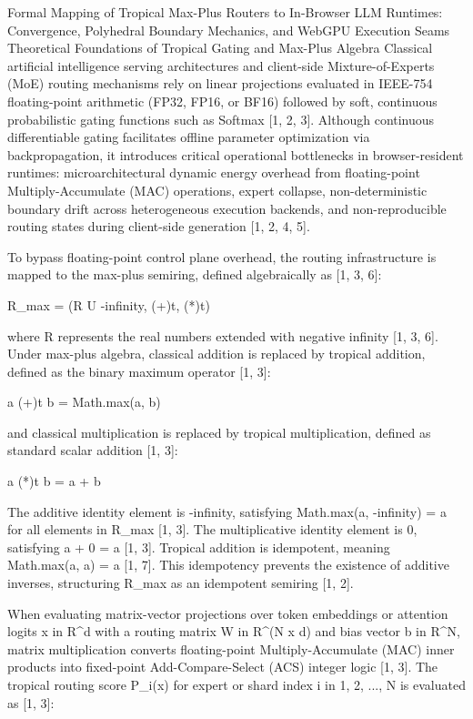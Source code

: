 ﻿Formal Mapping of Tropical Max-Plus Routers to In-Browser LLM Runtimes: Convergence, Polyhedral Boundary Mechanics, and WebGPU Execution Seams
Theoretical Foundations of Tropical Gating and Max-Plus Algebra
Classical artificial intelligence serving architectures and client-side Mixture-of-Experts (MoE) routing mechanisms rely on linear projections evaluated in IEEE-754 floating-point arithmetic (FP32, FP16, or BF16) followed by soft, continuous probabilistic gating functions such as Softmax [1, 2, 3]. Although continuous differentiable gating facilitates offline parameter optimization via backpropagation, it introduces critical operational bottlenecks in browser-resident runtimes: microarchitectural dynamic energy overhead from floating-point Multiply-Accumulate (MAC) operations, expert collapse, non-deterministic boundary drift across heterogeneous execution backends, and non-reproducible routing states during client-side generation [1, 2, 4, 5].


To bypass floating-point control plane overhead, the routing infrastructure is mapped to the max-plus semiring, defined algebraically as [1, 3, 6]:


R_max = (R U {-infinity}, (+)t, (*)t)


where R represents the real numbers extended with negative infinity [1, 3, 6]. Under max-plus algebra, classical addition is replaced by tropical addition, defined as the binary maximum operator [1, 3]:


a (+)t b = Math.max(a, b)


and classical multiplication is replaced by tropical multiplication, defined as standard scalar addition [1, 3]:


a (*)t b = a + b


The additive identity element is -infinity, satisfying Math.max(a, -infinity) = a for all elements in R_max [1, 3]. The multiplicative identity element is 0, satisfying a + 0 = a [1, 3]. Tropical addition is idempotent, meaning Math.max(a, a) = a [1, 7]. This idempotency prevents the existence of additive inverses, structuring R_max as an idempotent semiring [1, 2].


When evaluating matrix-vector projections over token embeddings or attention logits x in R^d with a routing matrix W in R^(N x d) and bias vector b in R^N, matrix multiplication converts floating-point Multiply-Accumulate (MAC) inner products into fixed-point Add-Compare-Select (ACS) integer logic [1, 3]. The tropical routing score P_i(x) for expert or shard index i in {1, 2, ..., N} is evaluated as [1, 3]:


